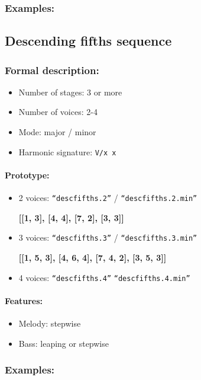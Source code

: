 ﻿\documentclass[11pt, openany]{article}
\begin{document}
\subsubsection{Examples:}


	\subsection{Descending fifths sequence}
	
\subsubsection{Formal description:}
\begin{itemize}
\item Number of stages: 3 or more
\item Number of voices: 2-4
\item Mode: major / minor
\item Harmonic signature: \texttt{V/x x}
\end{itemize}

\paragraph{Prototype:}
\begin{itemize}
\item 2 voices: \texttt{“descfifths.2”} / \texttt{“descfifths.2.min”}
	\begin{center}
    \textbf{[[1, 3], [4, 4], [7, 2], [3, 3]]}
    \end{center}
\item 3 voices: \texttt{“descfifths.3”} / \texttt{“descfifths.3.min”}
	\begin{center}
    \textbf{[[1, 5, 3], [4, 6, 4], [7, 4, 2], [3, 5, 3]]}
    \end{center}
\item 4 voices: \texttt{“descfifths.4”} \texttt{“descfifths.4.min”}
\end{itemize}

\paragraph{Features:}
\begin{itemize}
\item Melody: stepwise
\item Bass: leaping or stepwise
\end{itemize}

\subsubsection{Examples:}
\end{document}
